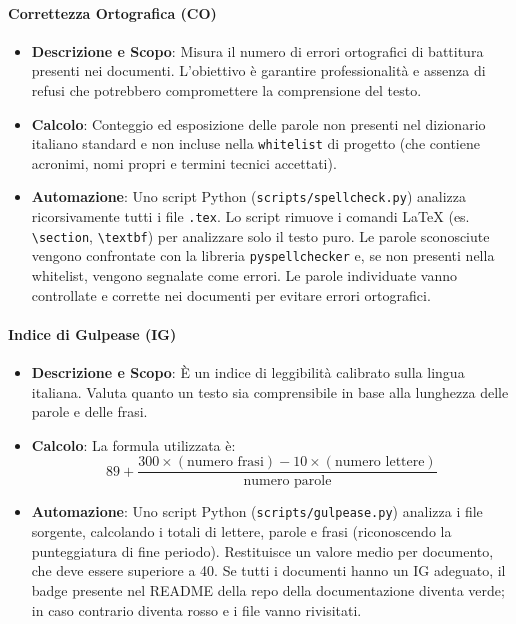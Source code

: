 \documentclass[11pt,a4paper]{article}
\begin{document}
\paragraph{Correttezza Ortografica (CO)}
\begin{itemize}
    \item \textbf{Descrizione e Scopo}: Misura il numero di errori ortografici di battitura presenti nei documenti. L'obiettivo è garantire professionalità e assenza di refusi che potrebbero compromettere la comprensione del testo.
    \item \textbf{Calcolo}: Conteggio ed esposizione delle parole non presenti nel dizionario italiano standard e non incluse nella \texttt{whitelist} di progetto (che contiene acronimi, nomi propri e termini tecnici accettati).
    \item \textbf{Automazione}: Uno script Python (\texttt{scripts/spellcheck.py}) analizza ricorsivamente tutti i file \texttt{.tex}. Lo script rimuove i comandi LaTeX (es. \texttt{\textbackslash section}, \texttt{\textbackslash textbf}) per analizzare solo il testo puro. Le parole sconosciute vengono confrontate con la libreria \texttt{pyspellchecker} e, se non presenti nella whitelist, vengono segnalate come errori. Le parole individuate vanno controllate e corrette nei documenti per evitare errori ortografici.
\end{itemize}

\paragraph{Indice di Gulpease (IG)}
\begin{itemize}
    \item \textbf{Descrizione e Scopo}: È un indice di leggibilità calibrato sulla lingua italiana. Valuta quanto un testo sia comprensibile in base alla lunghezza delle parole e delle frasi.
    \item \textbf{Calcolo}: La formula utilizzata è:
    \[ 89 + \frac{300 \times (\text{numero frasi}) - 10 \times (\text{numero lettere})}{\text{numero parole}} \]
    \item \textbf{Automazione}: Uno script Python (\texttt{scripts/gulpease.py}) analizza i file sorgente, calcolando i totali di lettere, parole e frasi (riconoscendo la punteggiatura di fine periodo). Restituisce un valore medio per documento, che deve essere superiore a 40. Se tutti i documenti hanno un IG adeguato, il badge presente nel README della repo della documentazione diventa verde; in caso contrario diventa rosso e i file vanno rivisitati.
\end{itemize}
\end{document}
